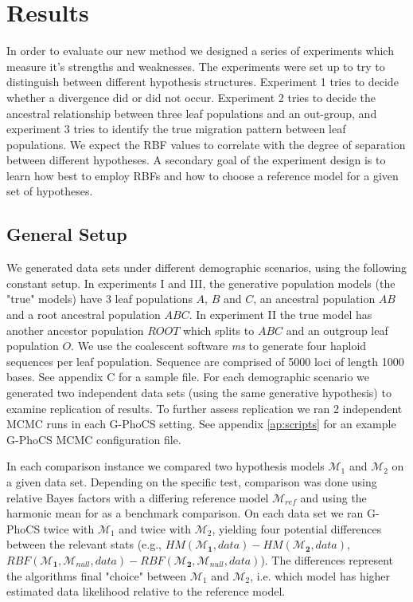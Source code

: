\documentclass[11pt]{article}
\newcommand{\M}{\mathcal{M}}
\newcommand{\1}{\mathbbm{1}}
\newcommand{\gp}{G-PhoCS }
\begin{document}
\section{Results} \label{Results}

In order to evaluate our new method we designed a series of experiments which measure it's strengths and weaknesses. 
%
The experiments were set up to try to distinguish between different hypothesis structures. 
%
Experiment 1 tries to decide whether a divergence did or did not occur. Experiment 2 tries to decide the ancestral relationship between three leaf populations and an out-group, and experiment 3 tries to identify the true migration pattern between leaf populations. 
%
We expect the RBF values to correlate with the degree of separation between different hypotheses.
%
A secondary goal of the experiment design is to learn how best to employ RBFs and how to choose a reference model for a given set of hypotheses.

\subsection{General Setup}
%
We generated data sets under different demographic scenarios, using the following constant setup. 
%
In experiments I and III, the generative population models (the "true" models) have 3 leaf populations $A$, $B$ and $C$, an ancestral population $AB$ and a root ancestral population $ABC$. 
%
In experiment II the true model has another ancestor population $ROOT$ which splits to $ABC$ and an outgroup leaf population $O$. 
%
We use the coalescent software \textit{ms} to generate four haploid sequences per leaf population. Sequence are comprised of 5000 loci of length 1000 bases. See appendix C for a sample file.
%
For each demographic scenario we generated two independent data sets (using the same generative hypothesis) to examine replication of results. 
%
To further assess replication we ran 2 independent MCMC runs in each G-PhoCS setting. See appendix \ref{ap:scripts} for an example \gp MCMC configuration file.


In each comparison instance we compared two hypothesis models $\M_1$ and $\M_2$ on a given data set. 
%
Depending on the specific test, comparison was done using relative Bayes factors with a differing reference model $\M_{ref}$ and using the harmonic mean for as a benchmark comparison. 
%
On each data set we ran \gp twice with $\M_1$ and twice with $\M_2$, yielding four potential differences between the relevant stats (e.g., $HM(\M_{\mathbf{1}}, data) - HM(\M_{\mathbf{2}},data)$, $RBF(\M_{\mathbf{1}}, \M_{null}, data) - RBF(\M_{\mathbf{2}}, \M_{null}, data)$). 
%
The differences represent the algorithms final "choice" between $\M_1$ and $\M_2$, i.e. which model has higher estimated data likelihood relative to the reference model.
\end{document}
